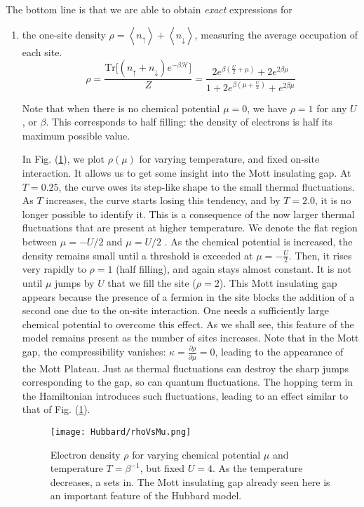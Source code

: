 The bottom line is that we are able to obtain \emph{exact} expressions for

\begin{enumerate}
\item the one-site density $\rho = \left\langle n_\uparrow \right\rangle + \left\langle n_\downarrow \right\rangle$, measuring the average occupation of each site.
\begin{equation}
\rho = \frac{\text{Tr} \big[ (n_\uparrow + n_\downarrow ) e^{-\beta\mathcal{H}} \big]}{Z} = \frac{2 e^{\beta(\frac{U}{2} + \mu)} + 2 e^{2\beta\mu}}{1 + 2 e^{\beta(\mu + \frac{U}{2})} + e^{2 \beta \mu}}
\end{equation}

Note that when there is no chemical potential $\mu = 0$, we have $\rho = 1$ for any $U$, or $\beta$.
This corresponds to half filling: the density of electrons is half its maximum possible value.

In Fig. (\ref{fig:rhoVsMu}), we plot $\rho(\mu)$ for varying temperature, and fixed on-site interaction.
It allows us to get some insight into the Mott insulating gap.
At $T = 0.25$, the curve owes its step-like shape to the small thermal fluctuations.
As $T$ increases, the curve starts losing this tendency, and by $T = 2.0$, it is no longer possible to identify it.
This is a consequence of the now larger thermal fluctuations that are present at higher temperature.
We denote the flat region between $\mu = - U / 2 $ and $\mu =  U / 2 $  .
As the chemical potential is increased, the density remains small until a threshold is exceeded at $\mu = - \frac{U}{2}$. 
Then, it rises very rapidly to $\rho = 1$ (half filling), and again stays almost constant.
It is not until $\mu$ jumps by $U$ that we fill the site ($\rho = 2$).
This Mott insulating gap appears because the presence of a fermion in the site blocks the addition of a second one due to the on-site interaction.
One needs a sufficiently large chemical potential to overcome this effect.
As we shall see, this feature of the model remains present as the number of sites increases.
Note that in the Mott gap, the compressibility vanishes: $\kappa = \frac{\partial \rho}{\partial \mu} = 0$, leading to the appearance of the Mott Plateau.
Just as thermal fluctuations can destroy the sharp jumps corresponding to the gap, so can quantum fluctuations.
The hopping term in the Hamiltonian introduces such fluctuations, leading to an effect similar to that of Fig.  (\ref{fig:rhoVsMu}).
\begin{figure}[H]
	\centering
\hspace{12mm}\texttt{[image: Hubbard/rhoVsMu.png]}
	\caption[Electron density in the purely atomic limit of the Hubbard model]{Electron density $\rho$ for varying chemical potential $\mu$ and temperature $T = \beta^{-1}$, but fixed $U = 4$. As the temperature decreases, a  sets in. The Mott insulating gap already seen here is an important feature of the Hubbard model.}
	\label{fig:rhoVsMu}
\end{figure}


\end{enumerate}
